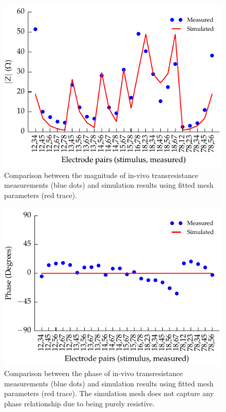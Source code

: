 \documentclass[journal, a4paper]{IEEEtran}
\begin{document}
\begin{figure}
    \begin{center}
        \includegraphics{graphics/sheep_transimpedance_doubleFit_mag}
    \end{center}
    \caption{\color{blue} Comparison between the magnitude of in-vivo transresistance measurements (blue dots) and simulation results using fitted mesh parameters (red trace).}
    \label{fig:transimpedance_sheep_mag}
\end{figure}

\begin{figure}
    \begin{center}
        \includegraphics{graphics/sheep_transimpedance_doubleFit_phase}
    \end{center}
    \caption{\color{blue} Comparison between the phase of in-vivo transresistance measurements (blue dots) and simulation results using fitted mesh parameters (red trace). The simulation mesh does not capture any phase relationship due to being purely resistive.}
    \label{fig:transimpedance_sheep_phase}
\end{figure}
\end{document}
